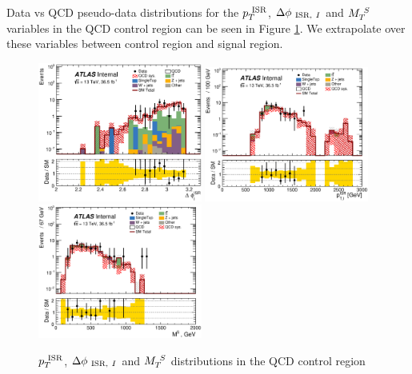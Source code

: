 \indent Data vs QCD pseudo-data distributions for the $\PTISR$, $\dphiISRI$ and $\MS$ variables in the QCD control region can be seen in Figure \ref{fig:QCD:CR}.  We extrapolate over these variables between control region and signal region. \\

\begin{figure}[!htbp]
\begin{center}
\includegraphics[width=0.48\textwidth]{figures/QCDJetSmearing/CRQC/dphiISRI_36500.eps}
\includegraphics[width=0.48\textwidth]{figures/QCDJetSmearing/CRQC/PTISR_36500}
\includegraphics[width=0.48\textwidth]{figures/QCDJetSmearing/CRQC/MV_36500}
\caption[$\PTISR$, $\dphiISRI$ and $\MS$ distributions in the QCD control region]{$\PTISR$, $\dphiISRI$ and $\MS$ distributions in the QCD control region}
\label{fig:QCD:CR}
\end{center}
\end{figure}

